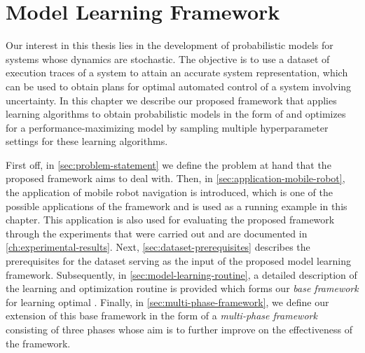 \chapter{Model Learning Framework}
\label{ch:methodology}

Our interest in this thesis lies in the development of probabilistic models for systems whose dynamics are stochastic.
The objective is to use a dataset of execution traces of a system to attain an accurate system representation, which can be used to obtain plans for optimal automated control of a system involving uncertainty.
In this chapter we describe our proposed framework that applies learning algorithms to obtain probabilistic models in the form of  and optimizes for a performance-maximizing model by sampling multiple hyperparameter settings for these learning algorithms.

First off, in \autoref{sec:problem-statement} we define the problem at hand that the proposed framework aims to deal with.
Then, in \autoref{sec:application-mobile-robot}, the application of mobile robot navigation is introduced, which is one of the possible applications of the framework and is used as a running example in this chapter.
This application is also used for evaluating the proposed framework through the experiments that were carried out and are documented in \autoref{ch:experimental-results}.
Next, \autoref{sec:dataset-prerequisites} describes the prerequisites for the dataset serving as the input of the proposed model learning framework.
Subsequently, in \autoref{sec:model-learning-routine}, a detailed description of the learning and optimization routine is provided which forms our \textit{base framework} for learning optimal .
Finally, in \autoref{sec:multi-phase-framework}, we define our extension of this base framework in the form of a \textit{multi-phase framework} consisting of three phases whose aim is to further improve on the effectiveness of the framework.

